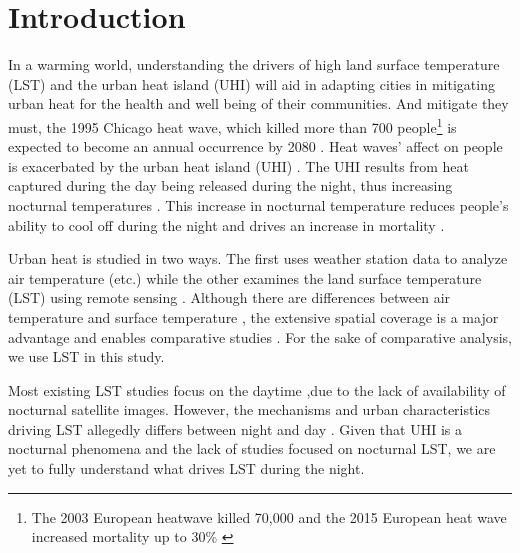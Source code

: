 \documentclass[final,3p,times,twocolumn,sort&compress]{elsarticle}
\begin{document}
\linenumbers

\section{Introduction}
In a warming world, understanding the drivers of high land surface temperature (LST) and the urban heat island (UHI) will aid in adapting cities in mitigating urban heat for the health and well being of their communities.
And mitigate they must, the 1995 Chicago heat wave, which killed more than 700 people\footnote{The 2003 European heatwave killed 70,000 \cite{Robine2008-ky} and the 2015 European heat wave increased mortality up to 30\% \cite{Vicedo-Cabrera2016-si}} is expected to become an annual occurrence by 2080 \cite{klinenberg2015heat}. 
Heat waves' affect on people is exacerbated by the urban heat island (UHI) \cite{Wicki2017-fv, Echevarria_Icaza2016-fr}.
The UHI results from heat captured during the day being released during the night, thus increasing nocturnal temperatures \cite{Oke2002-ta, Landsberg1981-mq, Rotach2005-yu}.
This increase in nocturnal temperature reduces people's ability to cool off during the night and drives an increase in mortality \cite{Echevarria_Icaza2016-fr, Murage2017-wj}.

Urban heat is studied in two ways.
The first uses weather station data to analyze air temperature \cite{Scott2016-lc}(etc.) while the other examines the land surface temperature (LST) using remote sensing \cite{Imhoff2010-lf, Peng2012-iy, Peng2018-cp, Zhou2014-wc}.
Although there are differences between air temperature and surface temperature \cite{Good2016-yk}, the extensive spatial coverage is a major advantage and enables comparative studies \cite{Hung2006-qy}.
For the sake of comparative analysis, we use LST in this study.

Most existing LST studies focus on the daytime \cite{Peng2018-cp,Chun2018-so,Wang2019-water,Zhou2018-iy},due to the lack of availability of nocturnal satellite images.
However, the mechanisms and urban characteristics driving LST allegedly differs between night and day \cite{Hung2006-qy, Chun2017-mm, Nichol2005-mm, Wicki2017-fv, Echevarria_Icaza2016-fr,Sobstyl2018-wt, Peng2012-iy, Zhou2014-wc, Zhao2017-cc}. 
Given that UHI is a nocturnal phenomena and the lack of studies focused on nocturnal LST, we are yet to fully understand what drives LST during the night.  
\end{document}
